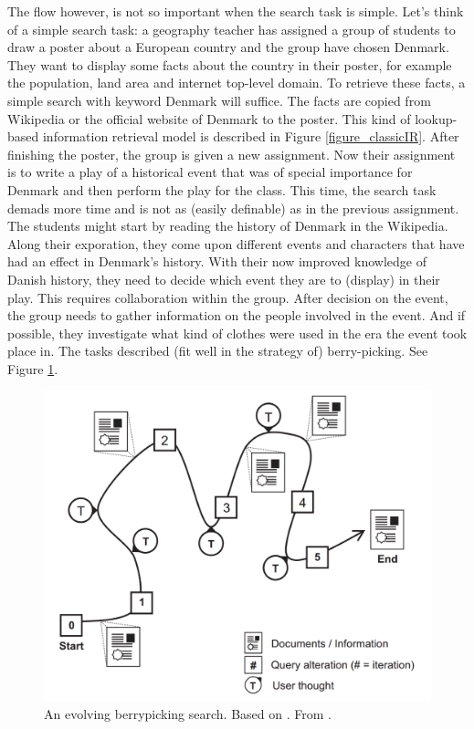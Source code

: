 The flow however, is not so important when the search task is simple. Let's think of a simple search task: a geography teacher has assigned a group of students to draw a poster about a European country and the group have chosen Denmark. They want to display some facts about the country in their poster, for example the population, land area and internet top-level domain. To retrieve these facts, a simple search with keyword Denmark will suffice. The facts are copied from Wikipedia or the official website of Denmark to the poster. This kind of lookup-based information retrieval model is described in Figure \ref{figure_classicIR}. 
After finishing the poster, the group is given a new assignment.
Now their assignment is to write a play of a historical event that was of special importance for Denmark and then perform the play for the class.
This time, the search task demads more time and is not as (easily definable) as in the previous assignment.
The students might start by reading the history of Denmark in the Wikipedia.
Along their exporation, they come upon different events and characters that have had an effect in Denmark's history.
With their now improved knowledge of Danish history, they need to decide which event they are to (display) in their play.
This requires collaboration within the group.
After decision on the event, the group needs to gather information on the people involved in the event. 
And if possible, they investigate what kind of clothes were used in the era the event took place in.
The tasks described (fit well in the strategy of) berry-picking. See Figure \ref{figure_bp}.

\begin{figure}[htp] %
\caption{An evolving berrypicking search. Based on \protect\cite{bates89}. From \protect\cite{march06}.}
\label{figure_bp}
\centering
\includegraphics[scale=0.25]{figures/berrypicking.pdf}
\end{figure}

